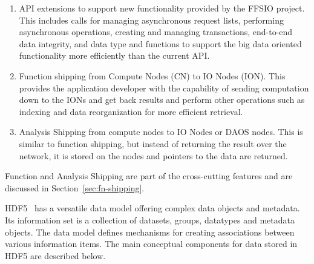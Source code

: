 \documentclass[conference]{IEEEtran} \pdfpagewidth=8.5in
\begin{document}
\begin{enumerate}
\def\labelenumi{\arabic{enumi}.}

\item
  API extensions to support new functionality provided by the FFSIO project.
  This includes calls for managing asynchronous request lists, performing
  asynchronous operations, creating and managing transactions, end-to-end data
  integrity, and data type and functions to support the big data oriented functionality more
  efficiently than the current API.

\item
  Function shipping from Compute Nodes (CN) to IO Nodes (ION). This provides
  the application developer with the capability of sending computation down to
  the IONs and get back results and perform other operations such as indexing
  and data reorganization for more efficient retrieval.

\item
  Analysis Shipping from compute nodes to IO Nodes or DAOS nodes. This is
  similar to function shipping, but instead of returning the result over the
  network, it is stored on the nodes and pointers to the data are returned.

\end{enumerate}

Function and Analysis Shipping are part of the cross-cutting features and are
discussed in Section~\ref{sec:fn-shipping}.

HDF5~\cite{hdf5} has a versatile data model offering complex data objects
and metadata. Its information set is a collection of datasets, groups,
datatypes and metadata objects. The data model defines mechanisms for
creating associations between various information items. The main
conceptual components for data stored in HDF5 are described below.
\end{document}
